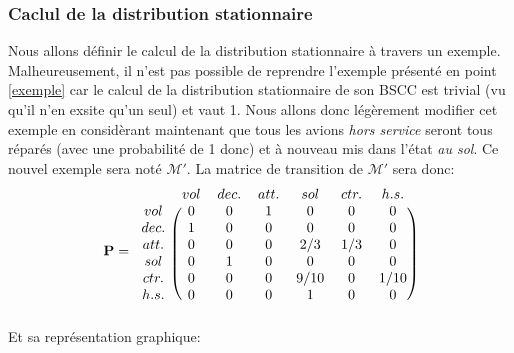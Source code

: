 \documentclass[letterpaper]{article}
\newcommand{\colornode}[1][]{\node[state,
	    align=center,
	    text=gray!40!black,
	    draw=gray,
	    fill=gray!20!white,{#1}]}
\newcommand{\bigcolornode}[1][]{\node[state,
	    align=center,
	    text=gray!40!black,
	    draw=gray,
	    fill=gray!20!white,
	    text width=1.7cm,{#1}]}
\newcommand{\drawedge}{\draw[every loop, line width=0.4mm, fill=gray, draw=gray]}
\begin{document}
    \subsubsection{Caclul de la distribution stationnaire}
      Nous allons définir le calcul de la distribution stationnaire à travers 
      un exemple.  Malheureusement, il n'est pas possible de reprendre l'exemple
      présenté en point \ref{exemple} car le calcul de la distribution stationnaire 
      de son BSCC est trivial (vu qu'il n'en exsite qu'un seul) et vaut 1.
      Nous allons donc légèrement modifier cet exemple en considèrant maintenant 
      que tous les avions \textit{hors service} seront tous réparés (avec une 
      probabilité de 1 donc) et à nouveau mis dans l'état \textit{au sol}.  
      Ce nouvel exemple sera noté $\mathcal{M}'$.
      La matrice de transition de $\mathcal{M}'$ sera donc:
      $$ \mathbf{P} = 
	\begin{blockarray}{ccccccc}
	& vol & dec. & att. & sol & ctr. & h.s. \\
	  \begin{block}{c(cccccc)}
	    vol  & 0 & 0 & 1 & 0    & 0   & 0    \\
	    dec. & 1 & 0 & 0 & 0    & 0   & 0    \\
	    att. & 0 & 0 & 0 & 2/3  & 1/3 & 0    \\
	    sol  & 0 & 1 & 0 & 0    & 0   & 0    \\
	    ctr. & 0 & 0 & 0 & 9/10 & 0   & 1/10 \\
	    h.s. & 0 & 0 & 0 & 1    & 0   & 0    \\
	  \end{block}
	\end{blockarray}
      $$
      Et sa représentation graphique:
      \begin{center}
      \end{center}
\end{document}
